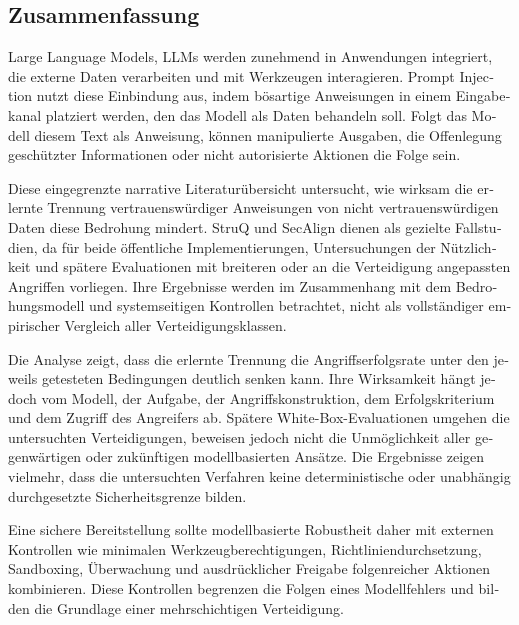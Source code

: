 \medskip
\begin{otherlanguage}{ngerman}
\section*{Zusammenfassung}

Large Language Models, LLMs werden zunehmend in
Anwendungen integriert, die externe Daten verarbeiten und mit Werkzeugen
interagieren. Prompt Injection nutzt diese Einbindung aus, indem bösartige
Anweisungen in einem Eingabekanal platziert werden, den das Modell als Daten
behandeln soll. Folgt das Modell diesem Text als Anweisung, können manipulierte
Ausgaben, die Offenlegung geschützter Informationen oder nicht autorisierte
Aktionen die Folge sein.

Diese eingegrenzte narrative Literaturübersicht untersucht, wie wirksam die
erlernte Trennung vertrauenswürdiger Anweisungen von nicht vertrauenswürdigen
Daten diese Bedrohung mindert. StruQ und SecAlign dienen als gezielte
Fallstudien, da für beide öffentliche Implementierungen, Untersuchungen der
Nützlichkeit und spätere Evaluationen mit breiteren oder an die Verteidigung
angepassten Angriffen vorliegen. Ihre Ergebnisse werden im Zusammenhang mit dem
Bedrohungsmodell und systemseitigen Kontrollen betrachtet, nicht als vollständiger
empirischer Vergleich aller Verteidigungsklassen.

Die Analyse zeigt, dass die erlernte Trennung die Angriffserfolgsrate unter den
jeweils getesteten Bedingungen deutlich senken kann. Ihre Wirksamkeit hängt
jedoch vom Modell, der Aufgabe, der Angriffskonstruktion, dem Erfolgskriterium
und dem Zugriff des Angreifers ab. Spätere White-Box-Evaluationen umgehen die
untersuchten Verteidigungen, beweisen jedoch nicht die Unmöglichkeit aller
gegenwärtigen oder zukünftigen modellbasierten Ansätze. Die Ergebnisse zeigen
vielmehr, dass die untersuchten Verfahren keine deterministische oder unabhängig
durchgesetzte Sicherheitsgrenze bilden.

Eine sichere Bereitstellung sollte modellbasierte Robustheit daher mit externen
Kontrollen wie minimalen Werkzeugberechtigungen, Richtliniendurchsetzung,
Sandboxing, Überwachung und ausdrücklicher Freigabe folgenreicher Aktionen
kombinieren. Diese Kontrollen begrenzen die Folgen eines Modellfehlers und bilden
die Grundlage einer mehrschichtigen Verteidigung.
\end{otherlanguage}
